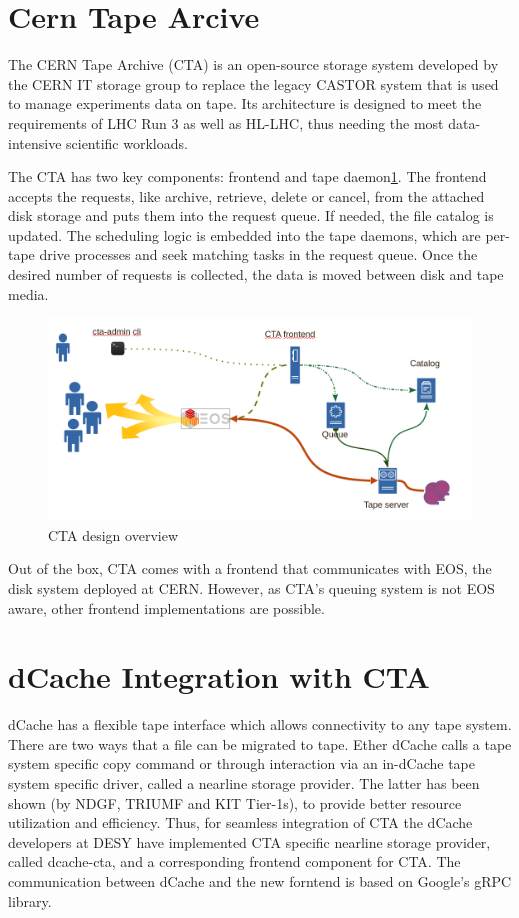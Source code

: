 \documentclass{webofc}
\begin{document}
\section{Cern Tape Arcive}
\label{sec:cta}

The CERN Tape Archive (CTA)\cite{cta} is an open-source storage system developed by the CERN IT storage group to
replace the legacy CASTOR system that is used to manage experiments data on tape. Its architecture is designed
to meet the requirements of LHC Run 3 as well as HL-LHC, thus needing the most data-intensive scientific workloads.

The CTA has two key components: frontend and tape daemon\ref{fig:cta_overview}. The frontend accepts the requests, like archive, retrieve, delete or cancel, from the attached disk storage and puts them into the request queue. If needed, the file catalog is updated. The scheduling logic is embedded into the tape daemons, which are per-tape drive processes and seek matching tasks in the request queue. Once the desired number of requests is collected, the data is moved  between disk and tape media.

\begin{figure}
    \centering
    \includegraphics[scale=0.25]{cta-design.png}
    \caption{CTA design overview}
    \label{fig:cta_overview}
\end{figure}

Out of the box, CTA comes with a frontend that communicates with EOS, the disk system deployed at CERN. However, as CTA's queuing system is not EOS aware, other frontend implementations are possible.

\section{dCache Integration with CTA}
\label{sec:integration}

dCache has a flexible tape interface which allows connectivity to any tape system. There are two ways that a file can be migrated to tape. Ether dCache calls a tape system specific copy command or through interaction via an in-dCache tape system specific driver, called a nearline storage provider. The latter has been shown (by NDGF, TRIUMF and KIT Tier-1s), to provide better resource utilization and efficiency\cite{endit_kit}. Thus, for seamless integration of CTA the dCache developers at DESY have implemented CTA specific nearline storage provider, called dcache-cta, and a corresponding frontend component for CTA. The communication between dCache and the new forntend is based on Google’s gRPC library.
\end{document}
